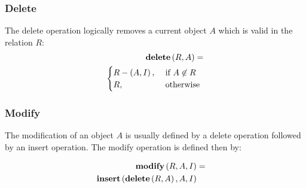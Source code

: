\subsubsection{Delete}
The delete operation logically removes a current object $A$ which is valid in the relation $R$:
\begin{align}
\label{eq:delete}
\mbox{\textbf{delete}} \left(R ,A \right) =\\
\begin{cases}
\nonumber
R - \left(A, I \right), & \mbox{ if }  A \not \in R\\
R, & \mbox{ otherwise }  
\end{cases} 	
\end{align}


\subsubsection{Modify}
The modification of an object $A$ is usually defined by a delete operation followed by an insert operation. The modify operation is defined then by:

\begin{align}
\label{eq:modify}
\mbox{\textbf{modify}} \left( R, A, I \right) &=&\\
\nonumber
\mbox{\textbf{insert}} \left( \mbox{\textbf{delete}} \left(R, A \right), A, I \right)
\end{align}